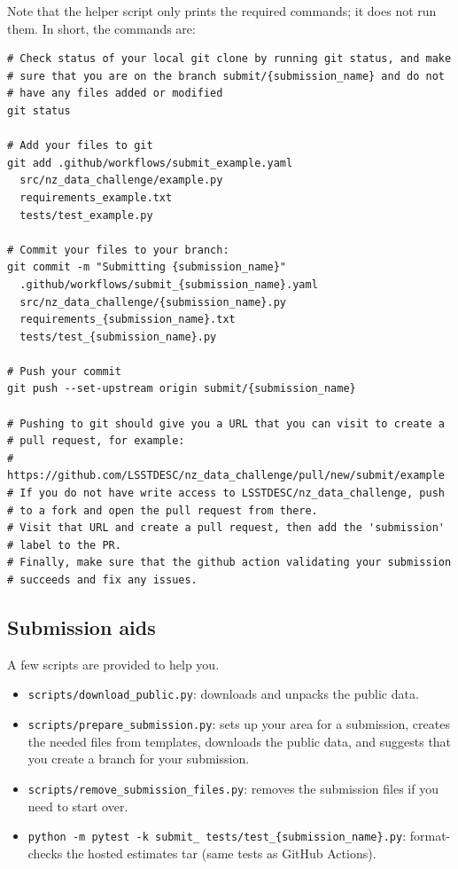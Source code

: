 \documentclass[11pt,twoside,letterpaper,onecolumn,english]{article}
\begin{document}
Note that the helper script only prints the required commands; it does
not run them.  In short, the commands are:

\begin{verbatim}
# Check status of your local git clone by running git status, and make
# sure that you are on the branch submit/{submission_name} and do not
# have any files added or modified
git status

# Add your files to git
git add .github/workflows/submit_example.yaml
  src/nz_data_challenge/example.py
  requirements_example.txt
  tests/test_example.py

# Commit your files to your branch: 
git commit -m "Submitting {submission_name}"
  .github/workflows/submit_{submission_name}.yaml
  src/nz_data_challenge/{submission_name}.py
  requirements_{submission_name}.txt
  tests/test_{submission_name}.py

# Push your commit
git push --set-upstream origin submit/{submission_name}

# Pushing to git should give you a URL that you can visit to create a
# pull request, for example:
#   https://github.com/LSSTDESC/nz_data_challenge/pull/new/submit/example
# If you do not have write access to LSSTDESC/nz_data_challenge, push
# to a fork and open the pull request from there.
# Visit that URL and create a pull request, then add the 'submission'
# label to the PR.
# Finally, make sure that the github action validating your submission
# succeeds and fix any issues.
\end{verbatim}


\subsection{Submission aids}

A few scripts are provided to help you.

\begin{itemize}
  \item{\texttt{scripts/download\_public.py}:  downloads and unpacks
      the public data.}    
  \item{\texttt{scripts/prepare\_submission.py}:  sets up your area for
      a submission, creates the needed files from templates,
      downloads the public data, and suggests that you create a branch
      for your submission.}
  \item{\texttt{scripts/remove\_submission\_files.py}:  removes the
      submission files if you need to start over.}
  \item{\texttt{python -m pytest -k submit\_ tests/test\_\{submission\_name\}.py}:
      format-checks the hosted estimates tar (same tests as GitHub Actions).}
\end{itemize}
      
\end{document}
